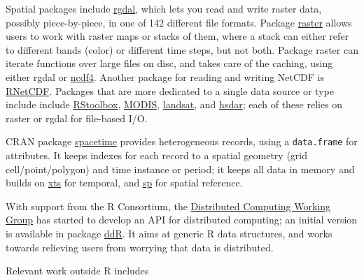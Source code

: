 Spatial packages include
\href{https://CRAN.R-project.org/package=rgdal}{rgdal}, which lets you
read and write raster data, possibly piece-by-piece, in one of 142
different file formats. Package
\href{https://CRAN.R-project.org/package=raster}{raster} allows users to
work with raster maps or stacks of them, where a stack can either refer
to different bands (color) or different time steps, but not both.
Package raster can iterate functions over large files on disc, and takes
care of the caching, using either rgdal or
\href{https://CRAN.R-project.org/package=ncdf4}{ncdf4}. Another package
for reading and writing NetCDF is
\href{https://cran.r-project.org/package=RNetCDF}{RNetCDF}. Packages
that are more dedicated to a single data source or type include include
\href{https://CRAN.R-project.org/package=RStoolbox}{RStoolbox},
\href{https://CRAN.R-project.org/package=MODIS}{MODIS},
\href{https://CRAN.R-project.org/package=landsat}{landsat}, and
\href{https://CRAN.R-project.org/package=hsdar}{hsdar}; each of these
relies on raster or rgdal for file-based I/O.

CRAN package
\href{https://CRAN.R-project.org/package=spacetime}{spacetime} provides
heterogeneous records, using a \texttt{data.frame} for attributes. It
keeps indexes for each record to a spatial geometry (grid
cell/point/polygon) and time instance or period; it keeps all data in
memory and builds on \href{https://CRAN.R-project.org/package=xts}{xts}
for temporal, and \href{https://CRAN.R-project.org/package=sp}{sp} for
spatial reference.

With support from the R Consortium, the
\href{https://wiki.r-consortium.org/view/Distributed_Computing_Working_Group}{Distributed
Computing Working Group} has started to develop an API for distributed
computing; an initial version is available in package
\href{https://github.com/vertica/ddR}{ddR}. It aims at generic R data
structures, and works towards relieving users from worrying that data is
distributed.

Relevant work outside R includes

